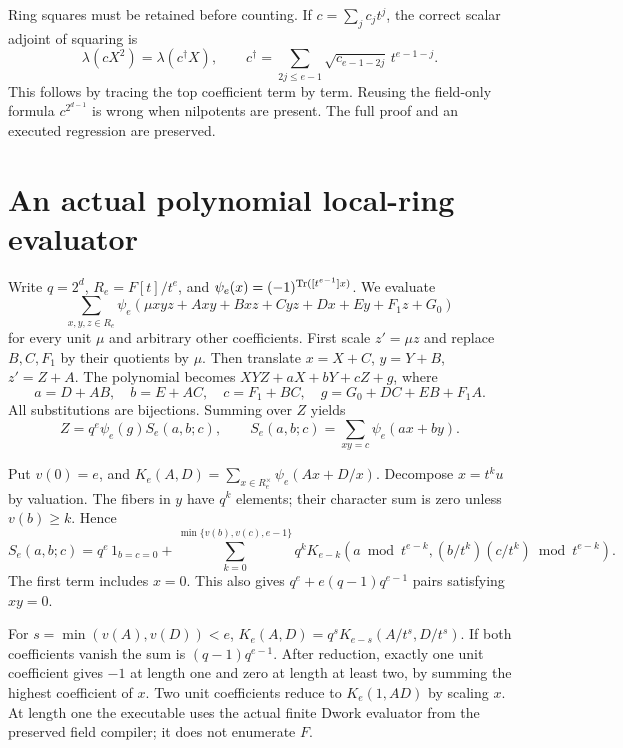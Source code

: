 \documentclass[11pt]{article}
\theoremstyle{remark}\newtheorem{remark}[theorem]{Remark}
\begin{document}
Ring squares must be retained before counting. If
$c=\sum_j c_jt^j$, the correct scalar adjoint of squaring is
\begin{equation}\label{eq:square}
 \lambda(cX^2)=\lambda(c^\dagger X),\qquad
 c^\dagger=\sum_{2j\le e-1}\sqrt{c_{e-1-2j}}\,t^{e-1-j}.
\end{equation}
This follows by tracing the top coefficient term by term. Reusing the
field-only formula $c^{2^{d-1}}$ is wrong when nilpotents are present.
The full proof and an executed regression are preserved.

\section{An actual polynomial local-ring evaluator}
Write $q=2^d$, $R_e=F[t]/t^e$, and
$\psi_e(x)=(-1)^{\operatorname{Tr}([t^{e-1}]x)}$.
We evaluate
\[
 \sum_{x,y,z\in R_e}\psi_e(\mu xyz+Axy+Bxz+Cyz+Dx+Ey+F_1z+G_0)
\]
for every unit $\mu$ and arbitrary other coefficients.
First scale $z'=\mu z$ and replace $B,C,F_1$ by their quotients by $\mu$.
Then translate $x=X+C$, $y=Y+B$, $z'=Z+A$. The polynomial becomes
$XYZ+aX+bY+cZ+g$, where
\[
 a=D+AB,\quad b=E+AC,\quad c=F_1+BC,\quad
 g=G_0+DC+EB+F_1A.
\]
All substitutions are bijections. Summing over $Z$ yields
\begin{equation}\label{eq:productfiber}
 Z=q^e\psi_e(g)S_e(a,b;c),\qquad
 S_e(a,b;c)=\sum_{xy=c}\psi_e(ax+by).
\end{equation}

Put $v(0)=e$, and
$K_e(A,D)=\sum_{x\in R_e^\times}\psi_e(Ax+D/x)$.
Decompose $x=t^ku$ by valuation. The fibers in $y$ have $q^k$ elements;
their character sum is zero unless $v(b)\ge k$. Hence
\begin{equation}\label{eq:valuation}
 S_e(a,b;c)=q^e\,1_{b=c=0}+
 \sum_{k=0}^{\min\{v(b),v(c),e-1\}}
 q^k K_{e-k}\left(a\bmod t^{e-k},
            (b/t^k)(c/t^k)\bmod t^{e-k}\right).
\end{equation}
The first term includes $x=0$. This also gives
$q^e+e(q-1)q^{e-1}$ pairs satisfying $xy=0$.

For $s=\min(v(A),v(D))<e$,
$K_e(A,D)=q^sK_{e-s}(A/t^s,D/t^s)$.
If both coefficients vanish the sum is $(q-1)q^{e-1}$.
After reduction, exactly one unit coefficient gives $-1$ at length one
and zero at length at least two, by summing the highest coefficient of $x$.
Two unit coefficients reduce to $K_e(1,AD)$ by scaling $x$.
At length one the executable uses the actual finite Dwork evaluator from
the preserved field compiler; it does not enumerate $F$.
\end{document}
